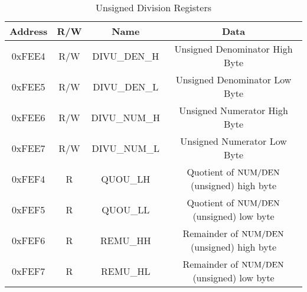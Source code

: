 \begin{table}[ht]
    \begin{center}
        \begin{tabular}{|c|c|c|c|} \hline
            Address & R/W & Name & Data \\\hline\hline
            0xFEE4  & R/W & DIVU\_DEN\_H & Unsigned Denominator High Byte \\\hline
            0xFEE5  & R/W & DIVU\_DEN\_L & Unsigned Denominator Low Byte \\\hline
            0xFEE6  & R/W & DIVU\_NUM\_H & Unsigned Numerator High Byte \\\hline
            0xFEE7  & R/W & DIVU\_NUM\_L & Unsigned Numerator Low Byte \\\hline
            0xFEF4  & R   & QUOU\_LH   & Quotient of ${\rm NUM} / {\rm DEN}$ (unsigned) high byte \\\hline
            0xFEF5  & R   & QUOU\_LL   & Quotient of ${\rm NUM} / {\rm DEN}$ (unsigned) low byte \\\hline
            0xFEF6  & R   & REMU\_HH   & Remainder of ${\rm NUM} / {\rm DEN}$ (unsigned) high byte \\\hline  
            0xFEF7  & R   & REMU\_HL   & Remainder of ${\rm NUM} / {\rm DEN}$ (unsigned) low byte \\\hline
        \end{tabular}
    \end{center}
    \caption{Unsigned Division Registers}
    \label{tab:math_div_reg}
\end{table}

